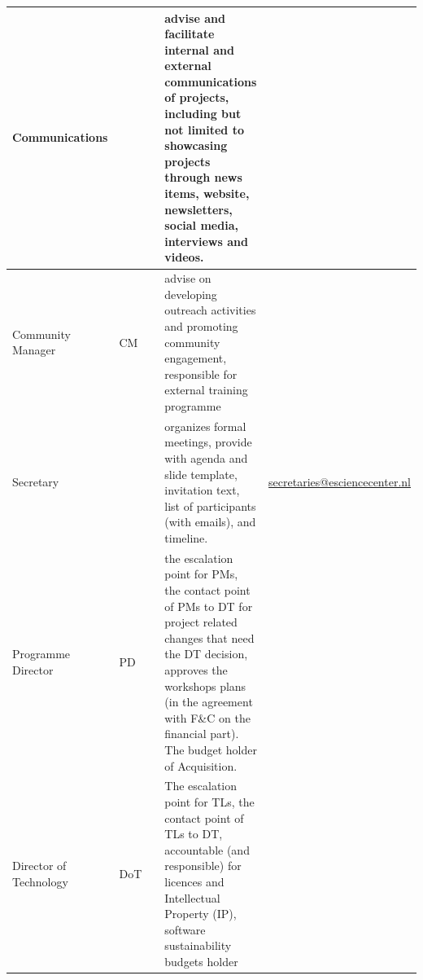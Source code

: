 \documentclass[11pt]{article}
\begin{document}
\begin{tabularx}{\linewidth}{p{}|p{}|p{}|p{}|p{}}
Communications                                     &                       &                                                                                                                   & advise and facilitate internal and external communications of projects, including but not limited to showcasing projects through news items, website, newsletters, social media, interviews and videos.                                &                                                                                                                                      \\\hline
Community Manager                                  & CM                    &                                                                                                                   & advise on developing outreach activities and promoting community engagement, responsible for external training programme                                                                                                               &                                                                                                                                      \\\hline
Secretary                                          &                       &                                                                                                                   & organizes formal meetings, provide with agenda and slide template, invitation text, list of participants (with emails), and timeline.                                                                                                  &  \href{mailto:secretaries@esciencecenter.nl}{secretaries@esciencecenter.nl}                                                                                         \\\hline
Programme Director                                 & PD                    &                                                                                                                   & the escalation point for PMs, the contact point of PMs to DT for project related changes that need the DT decision, approves the workshops plans (in the agreement with F\&C on the financial part). The budget holder of Acquisition. &                                                                                                                                      \\\hline
Director of Technology                             & DoT                   &                                                                                                                   & The escalation point for TLs, the contact point of TLs to DT, accountable (and responsible) for licences and Intellectual Property (IP), software sustainability budgets holder                                                        &                                                                                                                                      \\\hline

\end{tabularx}
\end{document}
